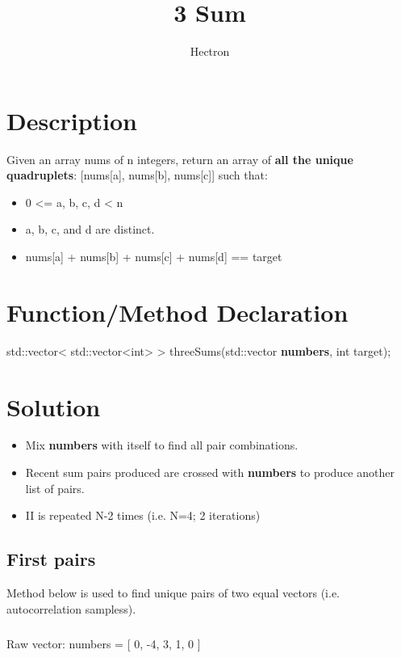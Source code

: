 \documentclass[a4paper,11pt]{article}
\author{Hectron}
\title{3 Sum}
\begin{document}
\maketitle

\tableofcontents

\newpage

\section{Description}
Given an array nums of n integers, return an array of \textbf{all the unique quadruplets}: [nums[a], nums[b], nums[c]]  such that: 

\begin{itemize}
  \item 0 <= a, b, c, d < n
  \item a, b, c, and d are distinct.
  \item nums[a] + nums[b] + nums[c] + nums[d] == target

\end{itemize}

\section{Function/Method Declaration}
\footnotesize
std::vector< std::vector<int> > threeSums(std::vector \textbf{numbers}, int target);

\section{Solution}
\begin{itemize}
    \item [I.]  Mix \textbf{numbers} with itself to find all pair combinations.
    \item [II.]  Recent sum pairs produced are crossed with \textbf{numbers} to produce another list of pairs.
    \item [III.] II is repeated N-2 times (i.e. N=4; 2 iterations)
\end{itemize}

    \subsection{First pairs}
    \noindent
    Method below is used to find unique pairs of two equal vectors (i.e. autocorrelation sampless). 

    \subparagraph{} 
    Raw vector: 
    numbers = [ 0, -4, 3, 1, 0 ] 
    
\end{document}
